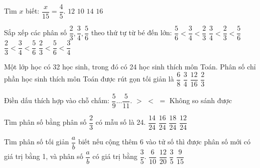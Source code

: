 \begin{ex} %
Tìm $x$ biết: $\dfrac{x}{15} = \dfrac{4}{5}$.
\choice
{\True $12$}
{$10$}
{$14$}
{$16$}
\end{ex}

\begin{ex} %
Sắp xếp các phân số $\dfrac{2}{3}, \dfrac{3}{4}, \dfrac{5}{6}$ theo thứ tự từ bé đến lớn:
\choice
{$\dfrac{5}{6} < \dfrac{3}{4} < \dfrac{2}{3}$}
{$\dfrac{3}{4} < \dfrac{2}{3} < \dfrac{5}{6}$}
{\True $\dfrac{2}{3} < \dfrac{3}{4} < \dfrac{5}{6}$}
{$\dfrac{2}{3} < \dfrac{5}{6} < \dfrac{3}{4}$}
\end{ex}

\begin{ex} %
Một lớp học có 32 học sinh, trong đó có 24 học sinh thích môn Toán. Phân số chỉ phần học sinh thích môn Toán được rút gọn tối giản là
\choice
{$\dfrac{6}{8}$}
{\True $\dfrac{3}{4}$}
{$\dfrac{12}{16}$}
{$\dfrac{2}{3}$}
\end{ex}

\begin{ex} %
Điền dấu thích hợp vào chỗ chấm: $\dfrac{5}{9} \dots \dfrac{5}{11}$.
\choice
{\True $>$}
{$<$}
{$=$}
{Không so sánh được}
\end{ex}

\begin{ex} %
Tìm phân số bằng phân số $\dfrac{2}{3}$ có mẫu số là 24.
\choice
{$\dfrac{14}{24}$}
{\True $\dfrac{16}{24}$}
{$\dfrac{18}{24}$}
{$\dfrac{12}{24}$}
\end{ex}

\begin{ex} %
Tìm phân số tối giản $\dfrac{a}{b}$ biết nếu cộng thêm 6 vào tử số thì được phân số mới có giá trị bằng 1, và phân số $\dfrac{a}{b}$ có giá trị bằng $\dfrac{3}{5}$.
\choice
{$\dfrac{6}{10}$}
{$\dfrac{12}{20}$}
{$\dfrac{3}{5}$}
{\True $\dfrac{9}{15}$}
\end{ex}

